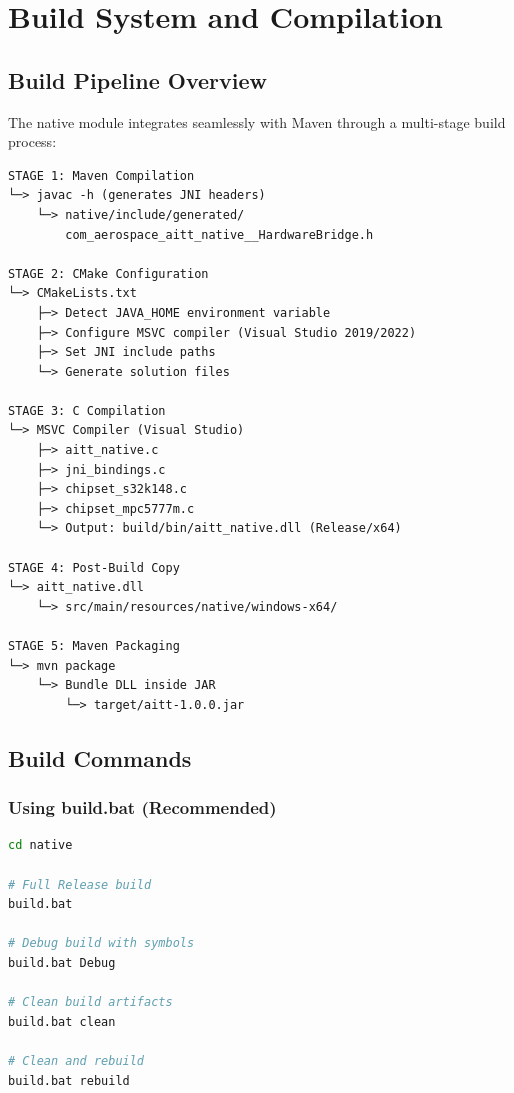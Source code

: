 \documentclass[12pt,a4paper]{article}
\begin{document}
\newpage

\section{Build System and Compilation}

\subsection{Build Pipeline Overview}

The native module integrates seamlessly with Maven through a multi-stage build process:

\begin{verbatim}
STAGE 1: Maven Compilation
└─> javac -h (generates JNI headers)
    └─> native/include/generated/
        com_aerospace_aitt_native__HardwareBridge.h

STAGE 2: CMake Configuration
└─> CMakeLists.txt
    ├─> Detect JAVA_HOME environment variable
    ├─> Configure MSVC compiler (Visual Studio 2019/2022)
    ├─> Set JNI include paths
    └─> Generate solution files

STAGE 3: C Compilation
└─> MSVC Compiler (Visual Studio)
    ├─> aitt_native.c
    ├─> jni_bindings.c
    ├─> chipset_s32k148.c
    ├─> chipset_mpc5777m.c
    └─> Output: build/bin/aitt_native.dll (Release/x64)

STAGE 4: Post-Build Copy
└─> aitt_native.dll
    └─> src/main/resources/native/windows-x64/

STAGE 5: Maven Packaging
└─> mvn package
    └─> Bundle DLL inside JAR
        └─> target/aitt-1.0.0.jar
\end{verbatim}

\subsection{Build Commands}

\subsubsection{Using build.bat (Recommended)}

\begin{lstlisting}[language=bash, caption=build.bat Usage]
cd native

# Full Release build
build.bat

# Debug build with symbols
build.bat Debug

# Clean build artifacts
build.bat clean

# Clean and rebuild
build.bat rebuild
\end{lstlisting}
\end{document}
